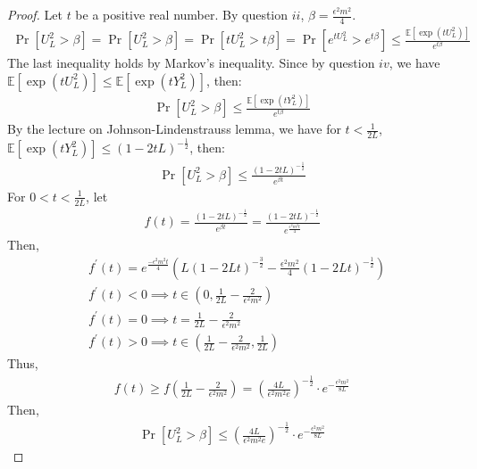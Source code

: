 \begin{proof}
    Let $t$ be a positive real number.
    By question $ii$, $\beta=\frac{\epsilon^2m^2}{4}$.
    \begin{align}
        \nonumber \Pr[U_L^2>\beta]=\Pr[U_L^2>\beta]=\Pr[tU_L^2>t\beta]=\Pr[e^{tU_L^2}>e^{t\beta}]\le\frac{\mathbb{E}[\exp({tU_L^2})]}{e^{t\beta}}
    \end{align}
    The last inequality holds by Markov's inequality. Since by question $iv$, we have $\mathbb{E}[\exp(tU_L^2)]\le \mathbb{E}[\exp(tY_L^2)]$, then:
    \begin{align}
        \nonumber \Pr[U_L^2>\beta]\le \frac{\mathbb{E}[\exp({tY_L^2})]}{e^{t\beta}}
    \end{align}
    By the lecture on Johnson-Lindenstrauss lemma, we have for $t<\frac{1}{2L}$, $\mathbb{E}[\exp({tY_L^2})]\le (1-2tL)^{-\frac{1}{2}}$, then:
    \begin{align}
        \nonumber \Pr[U_L^2>\beta]\le \frac{(1-2tL)^{-\frac{1}{2}}}{e^{\beta t}}
    \end{align}
    For $0<t<\frac{1}{2L}$, let 
    \begin{align}
        \nonumber f(t)=\frac{(1-2tL)^{-\frac{1}{2}}}{e^{\beta t}}=\frac{(1-2tL)^{-\frac{1}{2}}}{e^{\frac{\epsilon^2m^2t}{4}}}
    \end{align}
    Then, 
    \begin{align}
        \nonumber &f^{\prime}(t)=e^{\frac{-\epsilon^2m^2t}{4}}\left( L(1-2Lt)^{-\frac{3}{2}}-\frac{\epsilon^2m^2}{4}(1-2Lt)^{-\frac{1}{2}} \right)\\
        \nonumber &f^{\prime}(t)<0 \implies  t\in \left(0,\frac{1}{2L}-\frac{2}{\epsilon^2m^2}\right)\\
        \nonumber &f^{\prime}(t)=0 \implies  t=\frac{1}{2L}-\frac{2}{\epsilon^2m^2}\\
        \nonumber &f^{\prime}(t)>0 \implies  t\in \left(\frac{1}{2L}-\frac{2}{\epsilon^2m^2}, \frac{1}{2L}\right)
    \end{align} 
    Thus, 
    \begin{align}
        \nonumber f(t)\ge f\left(\frac{1}{2L}-\frac{2}{\epsilon^2m^2}\right)=\left( \frac{4L}{\epsilon^2m^2e} \right)^{-\frac{1}{2}}\cdot e^{-\frac{\epsilon^2m^2}{8L}}
    \end{align}
    Then,
    \begin{align}
        \nonumber \Pr[U_L^2>\beta] \le \left( \frac{4L}{\epsilon^2m^2e} \right)^{-\frac{1}{2}}\cdot e^{-\frac{\epsilon^2m^2}{8L}}
    \end{align}

\end{proof}
